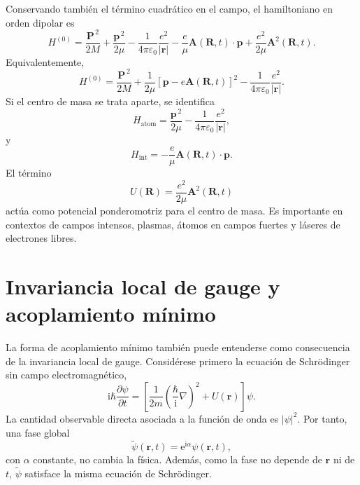 \documentclass[11pt]{article}
\newcommand{\ii}{\mathrm{i}}
\newcommand{\ee}{\mathrm{e}}
\newcommand{\vb}[1]{\mathbf{#1}}
\begin{document}
Conservando tambi\'en el t\'ermino cuadr\'atico en el campo, el hamiltoniano en
orden dipolar es
\begin{equation}
  H^{(0)}
  =
  \frac{\vb P^{\,2}}{2M}
  +
  \frac{\vb p^{\,2}}{2\mu}
  -
  \frac{1}{4\pi\varepsilon_0}
  \frac{e^2}{|\vb r|}
  -
  \frac{e}{\mu}\vb A(\vb R,t)\cdot\vb p
  +
  \frac{e^2}{2\mu}\vb A^2(\vb R,t).
\end{equation}
Equivalentemente,
\begin{equation}
  H^{(0)}
  =
  \frac{\vb P^{\,2}}{2M}
  +
  \frac{1}{2\mu}
  \left[
    \vb p-e\vb A(\vb R,t)
  \right]^2
  -
  \frac{1}{4\pi\varepsilon_0}
  \frac{e^2}{|\vb r|}.
\end{equation}
Si el centro de masa se trata aparte, se identifica
\begin{equation}
  H_{\mathrm{atom}}
  =
  \frac{\vb p^{\,2}}{2\mu}
  -
  \frac{1}{4\pi\varepsilon_0}
  \frac{e^2}{|\vb r|},
\end{equation}
y
\begin{equation}
  H_{\mathrm{int}}
  =
  -\frac{e}{\mu}\vb A(\vb R,t)\cdot\vb p.
\end{equation}
El t\'ermino
\begin{equation}
  U(\vb R)
  =
  \frac{e^2}{2\mu}\vb A^2(\vb R,t)
\end{equation}
act\'ua como potencial ponderomotriz para el centro de masa. Es importante en
contextos de campos intensos, plasmas, \'atomos en campos fuertes y l\'aseres
de electrones libres.

\section{Invariancia local de gauge y acoplamiento m\'inimo}

La forma de acoplamiento m\'inimo tambi\'en puede entenderse como consecuencia
de la invariancia local de gauge. Consid\'erese primero la ecuaci\'on de
Schr\"odinger sin campo electromagn\'etico,
\begin{equation}
  \ii\hbar\frac{\partial\psi}{\partial t}
  =
  \left[
    \frac{1}{2m}
    \left(
      \frac{\hbar}{\ii}\nabla
    \right)^2
    +
    U(\vb r)
  \right]\psi.
\end{equation}
La cantidad observable directa asociada a la funci\'on de onda es
\(|\psi|^2\). Por tanto, una fase global
\begin{equation}
  \tilde\psi(\vb r,t)
  =
  \ee^{\ii\alpha}\psi(\vb r,t),
\end{equation}
con \(\alpha\) constante, no cambia la f\'isica. Adem\'as, como la fase no
depende de \(\vb r\) ni de \(t\), \(\tilde\psi\) satisface la misma ecuaci\'on
de Schr\"odinger.
\end{document}
